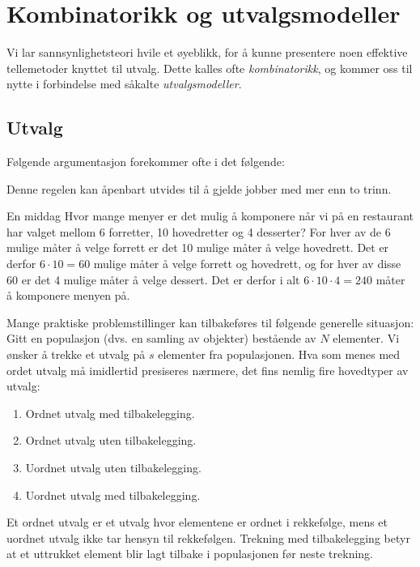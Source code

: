 \chapter{Kombinatorikk og utvalgsmodeller}
\label{kap:kombinatorikk} %

 Vi lar sannsynlighetsteori hvile et øyeblikk, for å kunne presentere
 noen effektive tellemetoder knyttet til utvalg. Dette  kalles ofte 
{\em kombinatorikk}, og kommer oss til nytte i forbindelse
med såkalte {\em utvalgsmodeller}.

\section{Utvalg}

Følgende argumentasjon forekommer ofte i det følgende:

\begin{center}  \end{center}

\noindent Denne regelen kan åpenbart utvides til å gjelde jobber med
mer enn to trinn. \\

\begin{eksempel}{En middag}
Hvor mange menyer er det mulig å komponere når vi på en
restaurant har valget mellom 6 forretter, 10 hovedretter og 4
desserter? For hver av de 6 mulige måter å velge forrett er det
10 mulige måter å velge hovedrett. Det er derfor $6\cdot 10 = 60$
mulige måter å velge forrett og hovedrett, og for hver av disse
60 er det 4 mulige måter å velge dessert. Det er derfor i alt
$6\cdot 10\cdot 4 = 240$ måter å komponere menyen på.
\end{eksempel}

Mange praktiske problemstillinger kan tilbakeføres til følgende
generelle situasjon: Gitt en populasjon (dvs. en samling av
objekter) bestående av $N$ elementer. Vi ønsker å trekke et utvalg
på $s$ elementer fra populasjonen. Hva som menes med ordet utvalg
må imidlertid presiseres nærmere, det fins nemlig fire hovedtyper
av utvalg:
\begin{enumerate}
\item  Ordnet utvalg med tilbakelegging.
\item  Ordnet utvalg uten tilbakelegging.
\item  Uordnet utvalg uten tilbakelegging.
\item  Uordnet utvalg med tilbakelegging.
\end{enumerate}
Et ordnet utvalg er et utvalg hvor elementene er ordnet i 
rekkefølge, mens et uordnet utvalg ikke tar hensyn til
rekkefølgen. Trekning med tilbakelegging betyr at et uttrukket
element blir lagt tilbake i populasjonen før neste
trekning.\\


